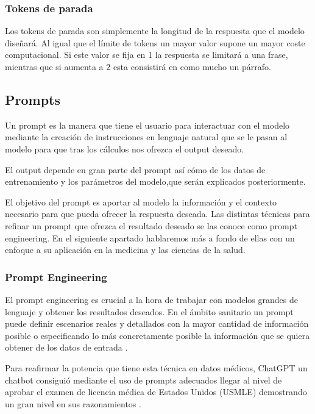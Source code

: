 \subsubsection{Tokens de parada}

Los tokens de parada son simplemente la longitud de la respuesta que el modelo diseñará. Al igual que el límite de tokens un mayor valor supone un mayor coste computacional. Si este valor se fija en 1 la respuesta se limitará a una frase, mientras que si aumenta a 2 esta consistirá en como mucho un párrafo.

\cite{jakindah_top_2023}

\subsection{Prompts}
Un prompt es la manera que tiene el usuario para interactuar con el modelo mediante la creación de instrucciones en lenguaje natural que se le pasan al modelo para que tras los cálculos nos ofrezca el output deseado.

El output depende en gran parte del prompt así cómo de los datos de entrenamiento y los parámetros del modelo,que serán explicados posteriormente.

El objetivo del prompt es aportar al modelo la información y el contexto necesario para que pueda ofrecer la respuesta deseada. Las distintas técnicas para refinar un prompt que ofrezca el resultado deseado se las conoce como prompt engineering. En el siguiente apartado hablaremos más a fondo de ellas con un enfoque a su aplicación en la medicina y las ciencias de la salud.

\subsubsection{Prompt Engineering}

El prompt engineering es crucial a la hora de trabajar con modelos grandes de lenguaje y obtener los resultados deseados. En el ámbito sanitario un prompt puede definir escenarios reales y detallados con la mayor cantidad de información posible o especificando lo más concretamente posible la información que se quiera obtener de los datos de entrada .

Para reafirmar la potencia que tiene esta técnica en datos médicos, ChatGPT un chatbot consiguió mediante el uso de prompts adecuados llegar al nivel de aprobar el examen de licencia médica de Estados Unidos (USMLE) demostrando un gran nivel en sus razonamientos \cite{thirunavukarasu_large_2023}.

